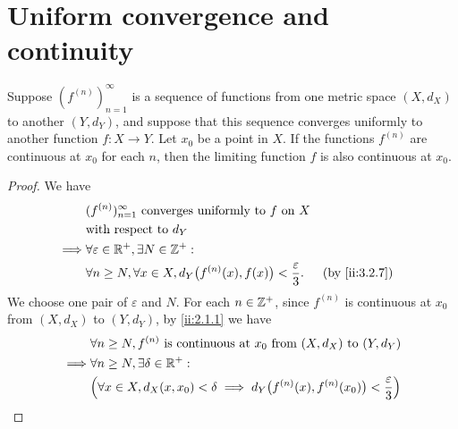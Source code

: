 \section{Uniform convergence and continuity}\label{ii:sec:3.3}

\begin{thm}\label{ii:3.3.1}
  Suppose \((f^{(n)})_{n = 1}^\infty\) is a sequence of functions from one metric space \((X, d_X)\) to another \((Y, d_Y)\), and suppose that this sequence converges uniformly to another function \(f : X \to Y\).
  Let \(x_0\) be a point in \(X\).
  If the functions \(f^{(n)}\) are continuous at \(x_0\) for each \(n\), then the limiting function \(f\) is also continuous at \(x_0\).
\end{thm}

\begin{proof}
  We have
  \begin{align*}
             & (f^{(n)})_{n = 1}^\infty \text{ converges uniformly to } f \text{ on } X                                      \\
             & \text{with respect to } d_Y                                                                                   \\
    \implies & \forall \varepsilon \in \R^+, \exists N \in \Z^+ :                                                            \\
             & \forall n \geq N, \forall x \in X, d_Y\big(f^{(n)}(x), f(x)\big) < \dfrac{\varepsilon}{3}. &  & \by{ii:3.2.7}
  \end{align*}
  We choose one pair of \(\varepsilon\) and \(N\).
  For each \(n \in \mathbb{Z}^+\), since \(f^{(n)}\) is continuous at \(x_0\) from \((X, d_X)\) to \((Y, d_Y)\), by \cref{ii:2.1.1} we have
  \begin{align*}
             & \forall n \geq N, f^{(n)} \text{ is continuous at } x_0 \text{ from } (X, d_X) \text{ to } (Y, d_Y)                                                                                            \\
    \implies & \forall n \geq N, \exists \delta \in \R^+ :                                                                                                                                                    \\
             & \Big(\forall x \in X, d_X(x, x_0) < \delta \implies d_Y\big(f^{(n)}(x), f^{(n)}(x_0)\big) < \dfrac{\varepsilon}{3}\Big)                                                                        \\

\end{align*}
\end{proof}
